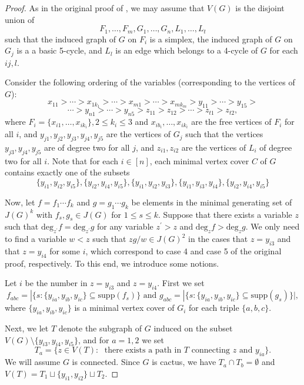 \documentclass[12pt]{amsart}
\let\:=\colon
\begin{document}
\begin{proof}  As in the original proof of  \cite[Theorem 4.3]{M}, we may assume that $V(G)$ is the disjoint union of $$F_1,\ldots,F_m,G_1,\ldots,G_n,L_1,\ldots,L_t$$
such that the induced graph of $G$ on $F_i$ is a simplex, the induced graph of $G$ on $G_j$ is a a basic 5-cycle, and $L_l$ is an edge which belongs to a 4-cycle of $G$  for each $ij,l$.

Consider the following ordering  of the variables (corresponding to the vertices of $G$): $$x_{11} >\cdots> x_{1k_1}>\cdots> x_{m1}>\cdots>x_{mk_m}>y_{11}>\cdots>y_{15}>$$ $$\cdots>y_{n1}>\cdots>y_{n5}>z_{11}>z_{12}>\cdots>z_{t1}>z_{t2},$$ where $F_{i}=\{{x_{i1},\ldots,x_{ik_i}}\}, 2\leq k_i\leq 3$ and ${x_{ib_i},\ldots ,x_{ik_i}}$ are the free vertices of $F_{i}$ for all $i$, and $y_{j1},y_{j2},y_{j3},y_{j4},y_{j5}$ are the vertices of $G_{j}$ such that the vertices $y_{j3},y_{j4},y_{j5}$ are of degree two for all $j$, and $z_{i1},z_{i2}$  are the vertices of $L_{i}$ of degree two for all $i$.
 Note that  for each $i\in [n]$, each minimal vertex cover $C$ of $G$ contains exactly one of the subsets $$\{y_{i1},y_{i2},y_{i5}\},\{y_{i2},y_{i4},y_{i5}\},\{y_{i1},y_{i2},y_{i3}\},\{y_{i1},y_{i3},y_{i4}\},\{y_{i2},y_{i4},y_{i5}\}$$




Now, let $f=f_{1} \cdots f_{k}$ and $g=g_{1} \cdots g_{k}$ be  elements in the minimal generating set of $J(G)^{k}$ with $f_s, g_s\in J(G)$ for $1\leq s\leq k$.  Suppose that there exists a variable $z$ such that $\mathrm{deg}_{z^{'}}f=\mathrm{deg}_{z^{'}}g$ for any variable $z^{'}>z$ and $\mathrm{deg}_{z}f>\mathrm{deg}_{z}g$. We only need to find a variable $w<z$ such that $zg/w\in J(G)^2$ in the  cases that $z=y_{i3}$ and that $z=y_{i4}$ for some $i$, which correspond to  case 4 and case 5 of the original proof, respectively. To this end, we introduce some notions.

  Let $i$ be the number in $z=y_{i3}$ and $z=y_{i4}$.   First we set $$f_{abc}=|\{s:\{y_{ia},y_{ib},y_{ic}\}\subseteq \mathrm{supp}(f_s) \} \mbox{ and  } g_{abc}=|\{s:\{y_{ia},y_{ib},y_{ic}\}\subseteq \mathrm{supp}(g_s) \}|,$$
   where   $\{y_{ia},y_{ib}, y_{ic}\}$ is a minimal vertex cover of $G_i$ for each triple $\{a,b,c\}$.




Next, we let $T$ denote the subgraph of $G$ induced on the  subset $V(G)\setminus \{y_{i3},y_{i4},y_{i5}\}$, and for $a=1,2$ we set
 $$T_a=\{z\in V(T)\:\; \mbox{ there exists a path in } T  \mbox{ connecting } z  \mbox{ and } y_{ia}\}.$$
We will assume $G$ is connected.  Since $G$ is cactus,  we have $T_a\cap T_b=\emptyset$ and $V(T)=T_1\sqcup \{y_{i1},y_{i2}\} \sqcup T_2$.





\end{proof}
\end{document}

